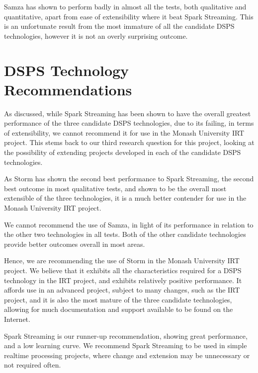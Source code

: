 Samza has shown to perform badly in almost all the tests, both qualitative and quantitative, apart from ease of extensibility where it beat Spark Streaming.
This is an unfortunate result from the most immature of all the candidate DSPS technologies, however it is not an overly
surprising outcome.



\section{DSPS Technology Recommendations} %
\label{sub:dsps_technology_recommendations}

As discussed, while Spark Streaming has been shown to have the overall greatest performance of the three candidate DSPS
technologies, due to its failing, in terms of extensibility, we cannot recommend it for use in the Monash University IRT
project. This stems back to our third research question for this project, looking at the possibility of extending projects
developed in each of the candidate DSPS technologies.

As Storm has shown the second best performance to Spark Streaming, the second best outcome in most qualitative tests,
and shown to be the overall most extensible of the three technologies, it is a much better contender for use in the Monash
University IRT project.

We cannot recommend the use of Samza, in light of its performance in relation to the other two technologies in all tests.
Both of the other candidate technologies provide better outcomes overall in most areas.

Hence, we are recommending the use of Storm in the Monash University IRT project. We believe that it exhibits all the
characteristics required for a DSPS technology in the IRT project, and exhibits relatively positive performance. It affords
use in an advanced project, subject to many changes, such as the IRT project, and it is
also the most mature of the three candidate technologies, allowing for much documentation and support available to be found on the
Internet.

Spark Streaming is our runner-up recommendation, showing great performance, and a low learning curve. We recommend
Spark Streaming to be used in simple realtime processing projects, where change and extension may be unnecessary or not
required often.



